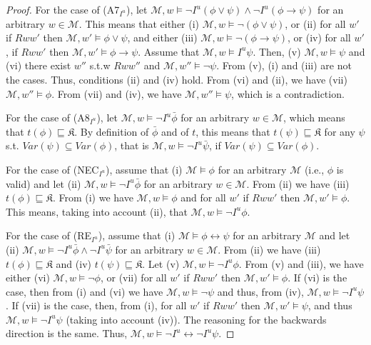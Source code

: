 \documentclass{article}
\begin{document}
\begin{proof}
For the case of (A7$_{I^{u}}$), let $\mathcal{M}, w \models \neg I^{u} (\phi \vee \psi) \wedge \neg I^{u}( \phi \rightarrow \psi)$ for an arbitrary $w \in \mathcal{M}$. This means that either (i) $\mathcal{M}, w \models \neg (\phi \vee \psi)$, or (ii) for all $w'$ if $Rww'$ then $\mathcal{M}, w' \models \phi \vee \psi$, and either (iii) $\mathcal{M}, w \models \neg (\phi \rightarrow \psi)$, or (iv) for all $w'$, if $Rww'$ then $\mathcal{M}, w' \models \phi \rightarrow \psi$. Assume that $\mathcal{M}, w \models I^{u} \psi$. Then, (v) $\mathcal{M}, w \models \psi$ and (vi) there exist $w''$ s.t.w $Rww''$ and $\mathcal{M}, w'' \models \neg \psi$. From (v), (i) and (iii) are not the cases. Thus, conditions (ii) and (iv) hold. From (vi) and (ii), we have (vii) $\mathcal{M}, w'' \models \phi$. From (vii) and (iv), we have $\mathcal{M}, w'' \models \psi$, which is a contradiction.

For the case of (A8$_{I^{u}}$), let $\mathcal{M}, w \models \neg I^{u} \bar{\phi}$ for an arbitrary $w \in \mathcal{M}$, which means that $t(\phi) \sqsubseteq \mathfrak{K}$. By definition of $\bar{\phi}$ and of $t$, this means that $t(\psi) \sqsubseteq \mathfrak{K}$ for any $\psi$ s.t. $Var(\psi) \subseteq Var (\phi) $, that is $\mathcal{M}, w \models \neg I^{u} \bar{\psi}$, if $Var(\psi) \subseteq Var(\phi)$.


For the case of (NEC$_{I^{u}}$), assume that (i) $\mathcal{M} \models \phi$ for an arbitrary $\mathcal{M}$ (i.e., $\phi$ is valid) and let (ii) $\mathcal{M}, w \models \neg I^{u} \bar{\phi}$ for an arbitrary $w \in \mathcal{M}$. From (ii) we have (iii) $t(\phi) \sqsubseteq \mathfrak{K}$. From (i) we have $\mathcal{M}, w \models \phi$ and for all $w'$ if $Rww'$ then $\mathcal{M}, w' \models \phi$. This means, taking into account (ii), that $\mathcal{M}, w \models \neg I^{u} \phi$. 

For the case of (RE$_{I^{u}}$), assume that (i) $\mathcal{M} \models \phi \leftrightarrow \psi$ for an arbitrary $\mathcal{M}$ and let (ii) $\mathcal{M}, w \models \neg I^{u} \bar{\phi} \wedge \neg I^{u} \bar{\psi}$ for an arbitrary $w \in \mathcal{M}$. From (ii) we have (iii) $t(\phi) \sqsubseteq \mathfrak{K}$ and (iv) $t(\psi) \sqsubseteq \mathfrak{K}$. Let (v) $\mathcal{M}, w \models \neg I^{u} \phi$. From (v) and (iii), we have either (vi) $\mathcal{M}, w \models \neg \phi$, or (vii) for all $w'$ if $Rww'$ then $\mathcal{M}, w' \models \phi$. If (vi) is the case, then from (i) and (vi) we have $\mathcal{M}, w \models \neg \psi$ and thus, from (iv), $\mathcal{M}, w \models \neg I^{u} \psi$. If (vii) is the case, then, from (i), for all $w'$ if $Rww'$ then $\mathcal{M}, w' \models \psi$, and thus $\mathcal{M}, w \models \neg I^{u} \psi$ (taking into account (iv)). The reasoning for the backwards direction is the same. Thus, $\mathcal{M}, w \models \neg I^{u} \leftrightarrow \neg I^{u} \psi$.

\end{proof}
\end{document}
